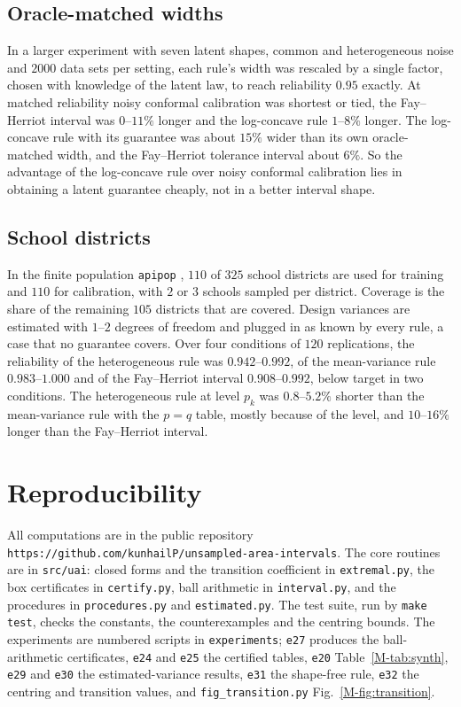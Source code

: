 \documentclass[11pt]{article}
\begin{document}
\subsection*{Oracle-matched widths}

In a larger experiment with seven latent shapes, common and heterogeneous noise and $2000$ data sets per setting, each rule's width was rescaled by a single factor, chosen with knowledge of the latent law, to reach reliability $0.95$ exactly. At matched reliability noisy conformal calibration was shortest or tied, the Fay--Herriot interval was $0$--$11\%$ longer and the log-concave rule $1$--$8\%$ longer. The log-concave rule with its guarantee was about $15\%$ wider than its own oracle-matched width, and the Fay--Herriot tolerance interval about $6\%$. So the advantage of the log-concave rule over noisy conformal calibration lies in obtaining a latent guarantee cheaply, not in a better interval shape.

\subsection*{School districts}

In the finite population \texttt{apipop} \citep{lumley2004}, $110$ of $325$ school districts are used for training and $110$ for calibration, with $2$ or $3$ schools sampled per district. Coverage is the share of the remaining $105$ districts that are covered. Design variances are estimated with $1$--$2$ degrees of freedom and plugged in as known by every rule, a case that no guarantee covers. Over four conditions of $120$ replications, the reliability of the heterogeneous rule was $0.942$--$0.992$, of the mean-variance rule $0.983$--$1.000$ and of the Fay--Herriot interval $0.908$--$0.992$, below target in two conditions. The heterogeneous rule at level $p_k$ was $0.8$--$5.2\%$ shorter than the mean-variance rule with the $p = q$ table, mostly because of the level, and $10$--$16\%$ longer than the Fay--Herriot interval.

\section{Reproducibility}\label{sec:s-code}

All computations are in the public repository \texttt{https://github.com/kunhailP/unsampled-area-intervals}. The core routines are in \texttt{src/uai}: closed forms and the transition coefficient in \texttt{extremal.py}, the box certificates in \texttt{certify.py}, ball arithmetic in \texttt{interval.py}, and the procedures in \texttt{procedures.py} and \texttt{estimated.py}. The test suite, run by \texttt{make test}, checks the constants, the counterexamples and the centring bounds. The experiments are numbered scripts in \texttt{experiments}; \texttt{e27} produces the ball-arithmetic certificates, \texttt{e24} and \texttt{e25} the certified tables, \texttt{e20} Table~\ref{M-tab:synth}, \texttt{e29} and \texttt{e30} the estimated-variance results, \texttt{e31} the shape-free rule, \texttt{e32} the centring and transition values, and \texttt{fig\_transition.py} Fig.~\ref{M-fig:transition}.



\end{document}
